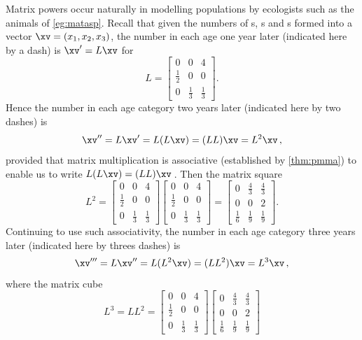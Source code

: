 \begin{example} \label{eg:poppred}
Matrix powers occur naturally in modelling populations by ecologists such as the animals of \autoref{eg:matasp}.
Recall that given the numbers of  s, s and s formed into a vector \(\xv=(x_1,x_2,x_3)\), the number in each age one year later (indicated here by a dash) is \(\xv'=L\xv\) for 
\begin{equation*}
L=\begin{bmatrix} 0&0&4\\\frac12&0&0\\0&\frac13&\frac13 \end{bmatrix}.
\end{equation*}
Hence the number in each age category two years later (indicated here by two dashes) is
\begin{equation*}
\xv''=L\xv'=L(L\xv)=(LL)\xv=L^2\xv\,,
\end{equation*}
provided that matrix multiplication is associative (established by \autoref{thm:pmma}) to enable us to write \(L(L\xv)=(LL)\xv\)\,.
Then the matrix square
\begin{equation*}
L^2=\begin{bmatrix} 0&0&4\\\frac12&0&0\\0&\frac13&\frac13 \end{bmatrix}\begin{bmatrix} 0&0&4\\\frac12&0&0\\0&\frac13&\frac13 \end{bmatrix}
=\begin{bmatrix} 0&\frac43&\frac43\\0&0&2\\\frac16&\frac19&\frac19 \end{bmatrix}.
\end{equation*}
Continuing to use such associativity, 
the number in each age category three years later (indicated here by threes dashes) is
\begin{equation*}
\xv'''=L\xv''=L(L^2\xv)=(LL^2)\xv=L^3\xv\,,
\end{equation*}
where the matrix cube
\begin{equation*}
L^3=LL^2=\begin{bmatrix} 0&0&4\\\frac12&0&0\\0&\frac13&\frac13 \end{bmatrix}\begin{bmatrix} 0&\frac43&\frac43\\0&0&2\\\frac16&\frac19&\frac19 \end{bmatrix}

\end{equation*}
\end{example}

